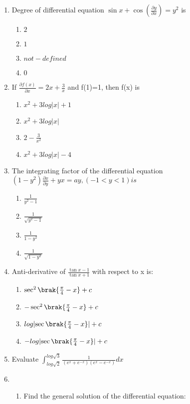 \begin{enumerate}
          \item Degree of differential equation $\sin x + \cos(\frac{\partial y}{\partial x})=y^2$ is
    \begin{enumerate}
        \item $2$
        \item $1$
        \item $not-defined$
        \item $0$
    \end{enumerate}
  \item  If $\frac{\partial f(x)}{\partial x}=2x+\frac{3}{x} $ and f(1)=1, then f(x) is
    \begin{enumerate}
        \item $x^2+3log|x|+1$
        \item $x^2+3log|x|$
        \item $2-\frac{3}{x^2}$
        \item $x^2+3log|x|-4$
    \end{enumerate}
    \item The integrating factor of the differential equation
     $(1-y^2)\frac{\partial x}{\partial y}+yx=ay,(-1<y<1) is$
    \begin{enumerate}
        \item $\frac{1}{y^2-1}$
        \item $\frac{1}{\sqrt{y^2-1}}$
        \item $\frac{1}{1-y^2}$
        \item $\frac{1}{\sqrt{1-y^2}}$
    \end{enumerate}
     \item Anti-derivative of $\frac{\tan x-1}{\tan x+1}$ with respect to x is:
    \begin{enumerate}
        \item $\sec^2\brak{\frac{\pi}{4}-x}+c$
        \item $-\sec^2\brak{\frac{\pi}{4}-x}+c$ 
        \item $log \lvert\sec\brak{\frac{\pi}{4}-x}\rvert+c$
        \item $-log \lvert\sec\brak{\frac{\pi}{4}-x}\rvert+c$ 
    \end{enumerate}
     \item Evaluate   $\int_{log {\sqrt 2}}^{log \sqrt{3}} \frac{1}{(e^x + e^{-x})(e^x - e^{-x})} dx$
     \item \begin{enumerate}
            \item Find the general solution of the differential equation:\\

\end{enumerate}
\end{enumerate}
